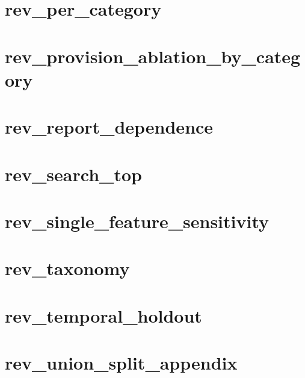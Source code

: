 \documentclass{article}
\begin{document}
\section*{rev\_per\_category}
\resizebox{\linewidth}{!}{}
\clearpage
\section*{rev\_provision\_ablation\_by\_category}
\resizebox{\linewidth}{!}{}
\clearpage
\section*{rev\_report\_dependence}
\resizebox{\linewidth}{!}{}
\clearpage
\section*{rev\_search\_top}
\resizebox{\linewidth}{!}{}
\clearpage
\section*{rev\_single\_feature\_sensitivity}
\resizebox{\linewidth}{!}{}
\clearpage
\section*{rev\_taxonomy}
\resizebox{\linewidth}{!}{}
\clearpage
\section*{rev\_temporal\_holdout}
\resizebox{\linewidth}{!}{}
\clearpage
\section*{rev\_union\_split\_appendix}
\resizebox{\linewidth}{!}{}
\clearpage
\end{document}
